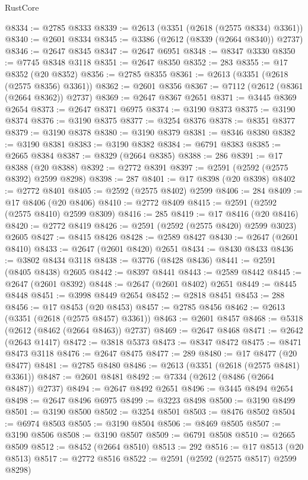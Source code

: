 \begin{lexlean}{RustCore}
\begin{coremodule}
@8334 := @2785 @8333
@8339 := @2613 (@3351 (@2618 (@2575 @8334) @3361))
@8340 := @2601 @8334
@8345 := @3386 (@2612 (@8339 (@2664 @8340)) @2737)
@8346 := @2647 @8345
@8347 := @2647 @6951
@8348 := @8347 @3330
@8350 := @7745 @8348 @3118
@8351 := @2647 @8350
@8352 := 283
@8355 := @17 @8352 (@20 @8352)
@8356 := @2785 @8355
@8361 := @2613 (@3351 (@2618 (@2575 @8356) @3361))
@8362 := @2601 @8356
@8367 := @7112 (@2612 (@8361 (@2664 @8362)) @2737)
@8369 := @2647 @8367 @2651
@8371 := @3445 @8369 @2654
@8373 := @2647 @8371 @6975
@8374 := @3190 @8373
@8375 := @3190 @8374
@8376 := @3190 @8375
@8377 := @3254 @8376
@8378 := @8351 @8377
@8379 := @3190 @8378
@8380 := @3190 @8379
@8381 := @8346 @8380
@8382 := @3190 @8381
@8383 := @3190 @8382
@8384 := @6791 @8383
@8385 := @2665 @8384
@8387 := @8329 (@2664 @8385)
@8388 := 286
@8391 := @17 @8388 (@20 @8388)
@8392 := @2772 @8391
@8397 := @2591 (@2592 (@2575 @8392) @2599 @8298)
@8398 := 287
@8401 := @17 @8398 (@20 @8398)
@8402 := @2772 @8401
@8405 := @2592 (@2575 @8402) @2599
@8406 := 284
@8409 := @17 @8406 (@20 @8406)
@8410 := @2772 @8409
@8415 := @2591 (@2592 (@2575 @8410) @2599 @8309)
@8416 := 285
@8419 := @17 @8416 (@20 @8416)
@8420 := @2772 @8419
@8426 := @2591 (@2592 (@2575 @8420) @2599 @3023) @2605
@8427 := @8415 @8426
@8428 := @2589 @8427
@8430 := @2647 (@2601 @8410)
@8433 := @2647 (@2601 @8420) @2651
@8434 := @8430 @8433
@8436 := @3802 @8434 @3118
@8438 := @3776 (@8428 @8436)
@8441 := @2591 (@8405 @8438) @2605
@8442 := @8397 @8441
@8443 := @2589 @8442
@8445 := @2647 (@2601 @8392)
@8448 := @2647 (@2601 @8402) @2651
@8449 := @8445 @8448
@8451 := @3998 @8449 @2654
@8452 := @2818 @8451
@8453 := 288
@8456 := @17 @8453 (@20 @8453)
@8457 := @2785 @8456
@8462 := @2613 (@3351 (@2618 (@2575 @8457) @3361))
@8463 := @2601 @8457
@8468 := @5318 (@2612 (@8462 (@2664 @8463)) @2737)
@8469 := @2647 @8468
@8471 := @2642 (@2643 @1417)
@8472 := @3818 @5373
@8473 := @8347 @8472
@8475 := @8471 @8473 @3118
@8476 := @2647 @8475
@8477 := 289
@8480 := @17 @8477 (@20 @8477)
@8481 := @2785 @8480
@8486 := @2613 (@3351 (@2618 (@2575 @8481) @3361))
@8487 := @2601 @8481
@8492 := @7334 (@2612 (@8486 (@2664 @8487)) @2737)
@8494 := @2647 @8492 @2651
@8496 := @3445 @8494 @2654
@8498 := @2647 @8496 @6975
@8499 := @3223 @8498
@8500 := @3190 @8499
@8501 := @3190 @8500
@8502 := @3254 @8501
@8503 := @8476 @8502
@8504 := @6974 @8503
@8505 := @3190 @8504
@8506 := @8469 @8505
@8507 := @3190 @8506
@8508 := @3190 @8507
@8509 := @6791 @8508
@8510 := @2665 @8509
@8512 := @8452 (@2664 @8510)
@8513 := 292
@8516 := @17 @8513 (@20 @8513)
@8517 := @2772 @8516
@8522 := @2591 (@2592 (@2575 @8517) @2599 @8298)

\end{coremodule}
\end{lexlean}
